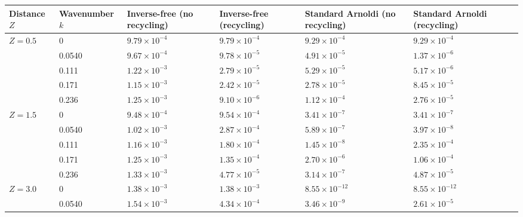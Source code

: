 \begin{table}[H]
    \centering
    \begin{tabular}{ |M{1.5cm}|M{2.0cm}|M{2.2cm} |M{2.2cm}|M{3cm}|M{3cm}|M{2.2cm}| } 
    \hline
    Distance $Z$ & Wavenumber $k$ &  Inverse-free (no recycling) & Inverse-free (recycling) & Standard Arnoldi (no recycling) & Standard Arnoldi (recycling)\\
    \hline
       & 0        & $9.79\times 10^{-4}$  & $9.79\times 10^{-4}$  &$9.29\times 10^{-4}$ &$9.29\times 10^{-4}$\\ 
                                   & 0.0540   & $9.67\times 10^{-4}$  & $9.78\times 10^{-5}$  &$4.91\times 10^{-5}$ &$1.37\times 10^{-6}$\\ 
                                   & 0.111    & $1.22\times 10^{-3}$  & $2.79\times 10^{-5}$  &$5.29\times 10^{-5}$ &$5.17\times 10^{-6}$\\ 
                                   & 0.171    & $1.15\times 10^{-3}$  & $2.42\times 10^{-5}$  &$2.78\times 10^{-5}$ &$8.45\times 10^{-5}$\\ 
                                   & 0.236    & $1.25\times 10^{-3}$  & $9.10\times 10^{-6}$  &$1.12\times 10^{-4}$ &$2.76\times 10^{-5}$\\ 
    \hline
    \hline
       & 0        & $9.48\times 10^{-4}$  & $9.54\times 10^{-4}$  &$3.41\times 10^{-7}$ &$3.41\times 10^{-7}$\\ 
                                   & 0.0540   & $1.02\times 10^{-3}$  & $2.87\times 10^{-4}$  &$5.89\times 10^{-7}$ &$3.97\times 10^{-8}$\\ 
                                   & 0.111    & $1.16\times 10^{-3}$  & $1.80\times 10^{-4}$  &$1.45\times 10^{-8}$ &$2.35\times 10^{-4}$\\ 
                                   & 0.171    & $1.25\times 10^{-3}$  & $1.35\times 10^{-4}$  &$2.70\times 10^{-6}$ &$1.06\times 10^{-4}$\\ 
                                   & 0.236    & $1.33\times 10^{-3}$  & $4.77\times 10^{-5}$  &$3.14\times 10^{-7}$ &$4.87\times 10^{-5}$\\ 
    \hline
    \hline
       & 0        & $1.38\times 10^{-3}$  & $1.38\times 10^{-3}$  &$8.55\times 10^{-12}$ &$8.55\times 10^{-12}$\\ 
                                   & 0.0540   & $1.54\times 10^{-3}$  & $4.34\times 10^{-4}$  &$3.46\times 10^{-9}$  &$2.61\times 10^{-5}$\\ 

\end{tabular}
\end{table}
